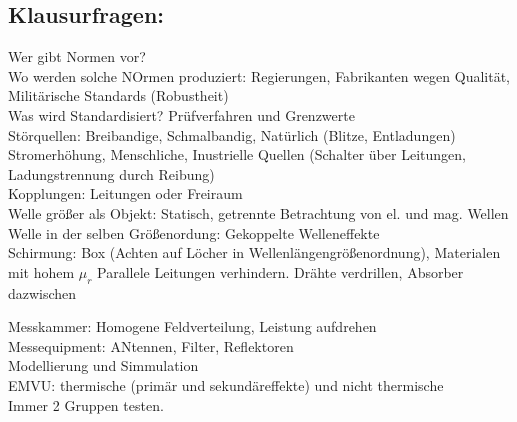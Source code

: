 \documentclass[fs, footer]{latex4ei}
\begin{document}
\begin{multicols*}{4}
\section{Klausurfragen:}
Wer gibt Normen vor?\\
Wo werden solche NOrmen produziert: Regierungen, Fabrikanten wegen Qualität, Militärische Standards (Robustheit)\\
Was wird Standardisiert? Prüfverfahren und Grenzwerte\\
Störquellen: Breibandige, Schmalbandig, Natürlich (Blitze, Entladungen) Stromerhöhung, 
Menschliche, Inustrielle Quellen (Schalter über Leitungen, Ladungstrennung durch Reibung)\\

Kopplungen: Leitungen oder Freiraum\\
Welle größer als Objekt: Statisch, getrennte Betrachtung von el. und mag. Wellen\\
Welle in der selben Größenordung: Gekoppelte Welleneffekte\\

Schirmung: Box (Achten auf Löcher in Wellenlängengrößenordnung), Materialen mit hohem $\mu_r$
Parallele Leitungen verhindern. Drähte verdrillen, Absorber dazwischen

Messkammer: Homogene Feldverteilung, Leistung aufdrehen\\
Messequipment: ANtennen, Filter, Reflektoren\\
Modellierung und Simmulation\\

EMVU: thermische (primär und sekundäreffekte) und nicht thermische\\
Immer 2 Gruppen testen.


\end{multicols*}

\end{document}
